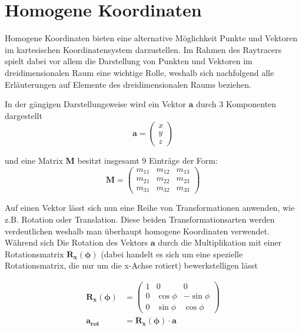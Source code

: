 \section{Homogene Koordinaten}

Homogene Koordinaten bieten eine alternative Möglichkeit Punkte und Vektoren im kartesischen Koordinatensystem darzustellen. Im Rahmen des Raytracers spielt dabei vor allem die Darstellung von Punkten
und Vektoren im dreidimensionalen Raum eine wichtige Rolle, weshalb sich nachfolgend alle Erläuterungen auf Elemente des dreidimensionalen Raums beziehen.

In der gängigen Darstellungsweise wird ein Vektor $\mathbf{a}$ durch 3 Komponenten dargestellt
\begin{equation*}
\textbf{a} = \begin{pmatrix}x \\ y\\ z\end{pmatrix}
\end{equation*}

und eine Matrix \textbf{M} besitzt insgesamt 9 Einträge der Form:
\begin{equation*}
\textbf{M} = \begin{pmatrix}
    m_{11} & m_{12} & m_{13}\\
    m_{21} & m_{22} & m_{23}\\
    m_{31} & m_{32} & m_{33}
\end{pmatrix}
\end{equation*}

Auf einen Vektor lässt sich nun eine Reihe von Transformationen anwenden, wie z.B. Rotation oder Translation.
Diese beiden Transformationsarten werden verdeutlichen weshalb man überhaupt homogene Koordinaten verwendet.
Während sich Die Rotation des Vektors $\mathbf{a}$ durch die Multiplikation mit einer Rotationsmatrix $\mathbf{R_x(\phi)}$ (dabei handelt es sich um eine spezielle Rotationsmatrix, die nur um die x-Achse rotiert) bewerkstelligen lässt


\begin{align*}
    \mathbf{R_x(\phi)}& = \begin{pmatrix}
                         1 & 0 & 0 \\
                         0 & \cos \phi & -\sin \phi \\
                         0 & \sin \phi & \cos \phi
                         \end{pmatrix}\\        
    \mathbf{a_{rot}}& = \mathbf{R_x(\phi)} \cdot \mathbf{a}
\end{align*}


